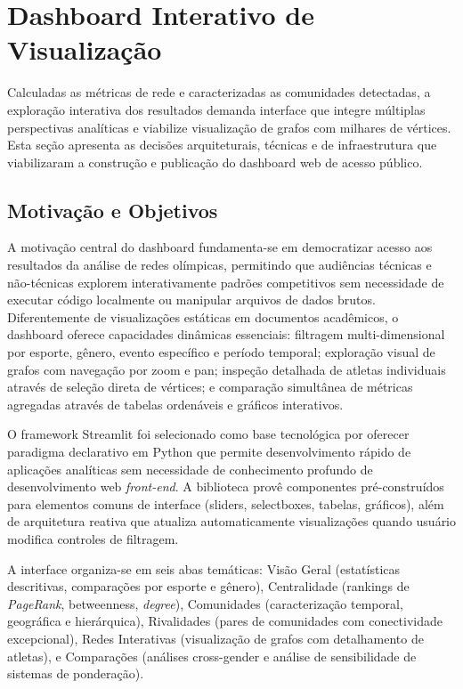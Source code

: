 \section{Dashboard Interativo de Visualização}

Calculadas as métricas de rede e caracterizadas as comunidades detectadas, a exploração interativa dos resultados demanda interface que integre múltiplas perspectivas analíticas e viabilize visualização de grafos com milhares de vértices. Esta seção apresenta as decisões arquiteturais, técnicas e de infraestrutura que viabilizaram a construção e publicação do dashboard web de acesso público.

\subsection{Motivação e Objetivos}

A motivação central do dashboard fundamenta-se em democratizar acesso aos resultados da análise de redes olímpicas, permitindo que audiências técnicas e não-técnicas explorem interativamente padrões competitivos sem necessidade de executar código localmente ou manipular arquivos de dados brutos. Diferentemente de visualizações estáticas em documentos acadêmicos, o dashboard oferece capacidades dinâmicas essenciais: filtragem multi-dimensional por esporte, gênero, evento específico e período temporal; exploração visual de grafos com navegação por zoom e pan; inspeção detalhada de atletas individuais através de seleção direta de vértices; e comparação simultânea de métricas agregadas através de tabelas ordenáveis e gráficos interativos.

O framework Streamlit foi selecionado como base tecnológica por oferecer paradigma declarativo em Python que permite desenvolvimento rápido de aplicações analíticas sem necessidade de conhecimento profundo de desenvolvimento web \textit{front-end}. A biblioteca provê componentes pré-construídos para elementos comuns de interface (sliders, selectboxes, tabelas, gráficos), além de arquitetura reativa que atualiza automaticamente visualizações quando usuário modifica controles de filtragem.

A interface organiza-se em seis abas temáticas: Visão Geral (estatísticas descritivas, comparações por esporte e gênero), Centralidade (rankings de \textit{PageRank}, betweenness, \textit{degree}), Comunidades (caracterização temporal, geográfica e hierárquica), Rivalidades (pares de comunidades com conectividade excepcional), Redes Interativas (visualização de grafos com detalhamento de atletas), e Comparações (análises cross-gender e análise de sensibilidade de sistemas de ponderação).

